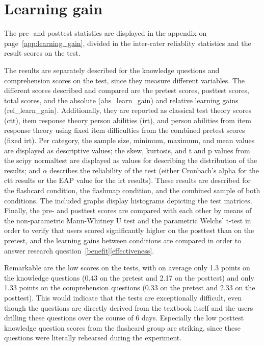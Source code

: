 \section{Learning gain}

The pre- and posttest statistics are displayed in the  appendix on page~\ref{app:learning_gain}, divided in the inter-rater reliablity statistics and the result scores on the test. 

The results are separately described for the knowledge questions and comprehension scores on the test, since they measure different variables. The different scores described and compared are the pretest scores, posttest scores, total scores, and the absolute (abs\_learn\_gain) and relative learning gains (rel\_learn\_gain). Additionally, they are reported as classical test theory scores (ctt), item response theory person abilities (irt), and person abilities from item response theory using fixed item difficulties from the combined pretest scores (fixed irt). Per category, the sample size, minimum, maximum, and mean values are displayed as descriptive values; the skew, kurtosis, and t and p values from the scipy normaltest are displayed as values for describing the distribution of the results; and $\alpha$ describes the reliability of the test (either Cronbach's alpha for the ctt results or the EAP value for the irt results). These results are described for the flashcard condition, the flashmap condition, and the combined sample of both conditions. The included graphs display histograms depicting the test matrices. Finally, the pre- and posttest scores are compared with each other by means of the non-parametric Mann-Whitney U test and the parametric Welchs' t-test in order to verify that users scored significantly higher on the posttest than on the pretest, and the learning gains between conditions are compared in order to answer research question~\ref{benefit}\ref{effectiveness}.

Remarkable are the low scores on the tests, with on average only 1.3 points on the knowledge questions (0.43 on the pretest and 2.17 on the posttest) and only 1.33 points on the comprehension questions (0.33 on the pretest and 2.33 on the posttest). This would indicate that the tests are exceptionally difficult, even though the questions are directly derived from the textbook itself and the users drilling these questions over the course of 6 days. Especially the low posttest knowledge question scores from the flashcard group are striking, since these questions were literally rehearsed during the experiment.

